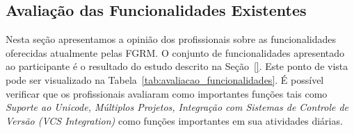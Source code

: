 \subsection{Avaliação das Funcionalidades Existentes}
\label{sub:avaliação_das_funcionalidades_existentes}

Nesta seção apresentamos a opinião dos profissionais sobre as funcionalidades
oferecidas atualmente pelas FGRM\@. O conjunto de funcionalidades apresentado ao
participante é o resultado do estudo descrito na Seção~\ref{}. Este ponto de
vista pode ser visualizado na Tabela~\ref{tab:avaliacao_funcionalidades}. É
possível verificar que os profissionais avaliaram como importantes funções tais
como \textit{Suporte ao Unicode, Múltiplos Projetos, Integração com Sistemas de
	Controle de Versão (VCS Integration)} como  funções importantes em sua
atividades diárias.

